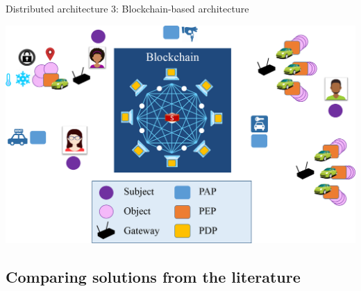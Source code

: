 \begin{frame}{Distributed architecture 3: Blockchain-based architecture}
    \begin{center}
        \includegraphics[scale=0.35]{Figures/bc_archi_alt.png}
    \end{center}    
\end{frame}

\subsection{Comparing solutions from the literature}

